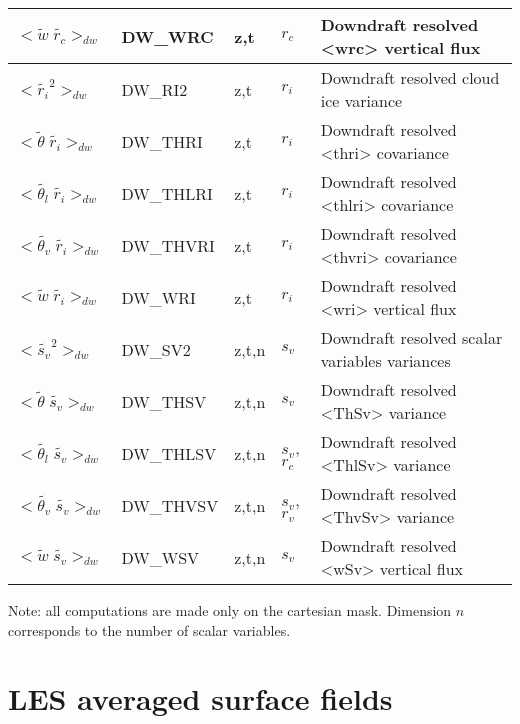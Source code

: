 \begin{longtable}[c]{|p{}|p{}|p{}|p{}|p{}|}
$<{\tilde{w}\;\tilde{r_c}}>_{dw}$             & DW\_WRC   & z,t   & $r_c$ & Downdraft resolved <wrc> vertical flux \\\hline
$<{\tilde{r_i}}^2>_{dw}$                      & DW\_RI2   & z,t   & $r_i$ & Downdraft resolved cloud ice variance \\\hline
$<{\tilde{\theta}\;\tilde{r_i}}>_{dw}$        & DW\_THRI  & z,t   & $r_i$ & Downdraft resolved <thri> covariance \\\hline
$<{\tilde{\theta_l}\;\tilde{r_i}}>_{dw}$      & DW\_THLRI & z,t   & $r_i$ & Downdraft resolved <thlri> covariance \\\hline
$<{\tilde{\theta_v}\;\tilde{r_i}}>_{dw}$      & DW\_THVRI & z,t   & $r_i$ & Downdraft resolved <thvri> covariance \\\hline
$<{\tilde{w}\;\tilde{r_i}}>_{dw}$             & DW\_WRI   & z,t   & $r_i$ & Downdraft resolved <wri> vertical flux \\\hline
$<{\tilde{s_v}}^2>_{dw}$                      & DW\_SV2   & z,t,n & $s_v$ & Downdraft resolved scalar variables variances \\\hline
$<{\tilde{\theta}\;\tilde{s_v}}>_{dw}$        & DW\_THSV  & z,t,n & $s_v$ & Downdraft resolved <ThSv> variance \\\hline
$<{\tilde{\theta_l}\;\tilde{s_v}}>_{dw}$      & DW\_THLSV & z,t,n & $s_v$, $r_c$ & Downdraft resolved <ThlSv> variance \\\hline
$<{\tilde{\theta_v}\;\tilde{s_v}}>_{dw}$      & DW\_THVSV & z,t,n & $s_v$, $r_v$ & Downdraft resolved <ThvSv> variance \\\hline
$<{\tilde{w}\;\tilde{s_v}}>_{dw}$             & DW\_WSV   & z,t,n & $s_v$ & Downdraft resolved <wSv> vertical flux \\\hline
\end{longtable}
\endgroup

Note: all computations are made only on the cartesian mask. Dimension $n$ corresponds to the number of scalar variables.


\section{LES averaged surface fields}

